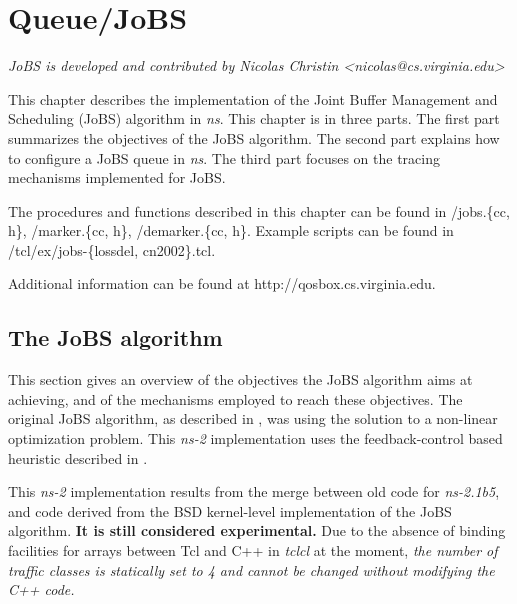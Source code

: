 \section{Queue/JoBS}
\label{sec:jobsx}

\emph{JoBS is developed and contributed by Nicolas Christin <nicolas@cs.virginia.edu>}

This chapter describes the implementation of the Joint Buffer Management 
and Scheduling (JoBS) algorithm in {\em ns}. This chapter is in three parts. 
The first part summarizes the objectives of the JoBS algorithm. The second 
part explains how to configure a JoBS queue in {\em ns}. The third part 
focuses on the tracing mechanisms implemented for JoBS. 

The procedures and functions described in this chapter can be found in 
\ns/jobs.\{cc, h\}, 
\ns/marker.\{cc, h\}, 
\ns/demarker.\{cc, h\}. 
Example scripts can be found 
in \ns/tcl/ex/jobs-\{lossdel, cn2002\}.tcl. 

\noindent Additional information 
can be found at http://qosbox.cs.virginia.edu.

\subsection{The JoBS algorithm}
This section gives an overview of the objectives the JoBS algorithm
aims at achieving, and of the mechanisms employed to reach these
objectives. The original JoBS algorithm, as described in
\cite{LiCh01}, was using the solution to a non-linear optimization
problem. This {\em ns-2} implementation uses the feedback-control
based heuristic described in \cite{ChLiAb02a}.

This {\em ns-2} implementation results from the 
merge between old code for {\em ns-2.1b5}, and code derived from the 
BSD kernel-level 
implementation of the JoBS algorithm. {\bf It is still considered experimental.}
Due to the absence of binding facilities for arrays 
between Tcl and C++ in {\em tclcl} at the moment, {\em the number of 
traffic classes is 
statically set to 4 and cannot be changed without modifying the C++ code.}

